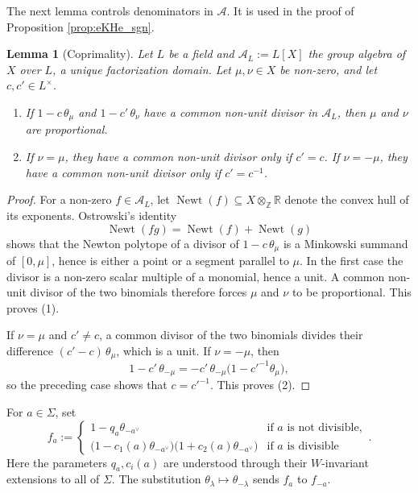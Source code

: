 \documentclass[12pt]{article}
\numberwithin{equation}{section}
\newtheorem{lemma}[theorem]{Lemma}
\theoremstyle{definition}
\theoremstyle{remark}
\theoremstyle{plain}
\begin{document}
The next lemma controls denominators in $\mathcal{A}$. It is used in the proof of Proposition \ref{prop:eKHe_sgn}.

\begin{lemma}[Coprimality]\label{lem:coprime}
Let $L$ be a field and $\mathcal{A}_L := L[X]$ the group algebra of $X$ over $L$, a unique factorization domain. Let $\mu, \nu \in X$ be non-zero, and let $c, c' \in L^\times$.
\begin{enumerate}
\item If $1 - c\,\theta_\mu$ and $1 - c'\,\theta_\nu$ have a common non-unit divisor in $\mathcal{A}_L$, then $\mu$ and $\nu$ are proportional.
\item If $\nu = \mu$, they have a common non-unit divisor only if $c' = c$. If $\nu = -\mu$, they have a common non-unit divisor only if $c' = c^{-1}$.
\end{enumerate}
\end{lemma}
\begin{proof}
For a non-zero $f \in \mathcal{A}_L$, let $\operatorname{Newt}(f) \subseteq X \otimes_{\mathbb{Z}} \mathbb{R}$ denote the convex hull of its exponents. Ostrowski's identity \cite[Theorem VI]{Ost75}
$$\operatorname{Newt}(fg) = \operatorname{Newt}(f) + \operatorname{Newt}(g)$$
shows that the Newton polytope of a divisor of $1 - c\,\theta_\mu$ is a Minkowski summand of $[0,\mu]$, hence is either a point or a segment parallel to $\mu$. In the first case the divisor is a non-zero scalar multiple of a monomial, hence a unit. A common non-unit divisor of the two binomials therefore forces $\mu$ and $\nu$ to be proportional. This proves (1).

If $\nu = \mu$ and $c' \neq c$, a common divisor of the two binomials divides their difference $(c' - c)\,\theta_\mu$, which is a unit. If $\nu = -\mu$, then
$$1 - c'\,\theta_{-\mu} = -c'\,\theta_{-\mu}\big(1 - c'^{-1}\theta_\mu\big),$$
so the preceding case shows that $c = c'^{-1}$. This proves (2).
\end{proof}

For $a\in\Sigma$, set
$$f_a := \begin{cases} 1 - q_a\theta_{-a^\vee} & \text{if } a \text{ is not divisible},\\[2pt] \big(1 - c_1(a)\theta_{-a^\vee}\big)\big(1 + c_2(a)\theta_{-a^\vee}\big) & \text{if } a \text{ is divisible}\end{cases}.$$
Here the parameters $q_a, c_i(a)$ are understood through their $W$-invariant extensions to all of $\Sigma$. The substitution $\theta_\lambda\mapsto\theta_{-\lambda}$ sends $f_a$ to $f_{-a}$.
\end{document}
